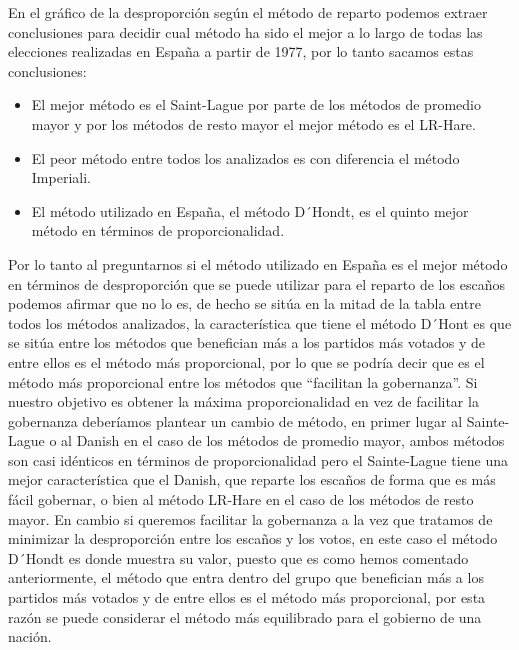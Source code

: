 \documentclass[12pt,a4paper,]{book}
\providecommand{\tightlist}{%
  \setlength{\itemsep}{0pt}\setlength{\parskip}{0pt}}
\numberwithin{dummy}{section}
\theoremstyle{ocrenumbox}
\theoremstyle{blacknumex}
\theoremstyle{blacknumbox}
\theoremstyle{ocrenum}
\theoremstyle{ocrenum}
\begin{document}
En el gráfico de la desproporción según el método de reparto podemos
extraer conclusiones para decidir cual método ha sido el mejor a lo
largo de todas las elecciones realizadas en España a partir de 1977, por
lo tanto sacamos estas conclusiones:

\begin{itemize}
\tightlist
\item
  El mejor método es el Saint-Lague por parte de los métodos de promedio
  mayor y por los métodos de resto mayor el mejor método es el LR-Hare.
\item
  El peor método entre todos los analizados es con diferencia el método
  Imperiali.
\item
  El método utilizado en España, el método D´Hondt, es el quinto mejor
  método en términos de proporcionalidad.
\end{itemize}

Por lo tanto al preguntarnos si el método utilizado en España es el
mejor método en términos de desproporción que se puede utilizar para el
reparto de los escaños podemos afirmar que no lo es, de hecho se sitúa
en la mitad de la tabla entre todos los métodos analizados, la
característica que tiene el método D´Hont es que se sitúa entre los
métodos que benefician más a los partidos más votados y de entre ellos
es el método más proporcional, por lo que se podría decir que es el
método más proporcional entre los métodos que ``facilitan la
gobernanza''. Si nuestro objetivo es obtener la máxima proporcionalidad
en vez de facilitar la gobernanza deberíamos plantear un cambio de
método, en primer lugar al Sainte-Lague o al Danish en el caso de los
métodos de promedio mayor, ambos métodos son casi idénticos en términos
de proporcionalidad pero el Sainte-Lague tiene una mejor característica
que el Danish, que reparte los escaños de forma que es más fácil
gobernar, o bien al método LR-Hare en el caso de los métodos de resto
mayor. En cambio si queremos facilitar la gobernanza a la vez que
tratamos de minimizar la desproporción entre los escaños y los votos, en
este caso el método D´Hondt es donde muestra su valor, puesto que es
como hemos comentado anteriormente, el método que entra dentro del grupo
que benefician más a los partidos más votados y de entre ellos es el
método más proporcional, por esta razón se puede considerar el método
más equilibrado para el gobierno de una nación.




\end{document}
